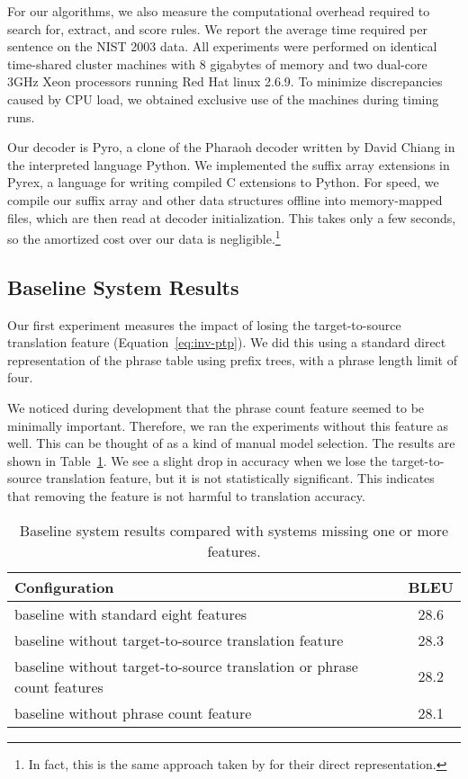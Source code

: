 For our algorithms, we also measure the computational
overhead required to search for, extract, and score rules.
We report the average time required
per sentence on the NIST 2003 data.  All experiments were
performed on identical time-shared cluster machines 
with 8 gigabytes of memory and two dual-core 3GHz Xeon 
processors running Red Hat linux 2.6.9.  
To minimize discrepancies caused by CPU
load, we obtained exclusive use of the machines during 
timing runs.

Our decoder is Pyro, a clone of the Pharaoh decoder
written by David Chiang in the interpreted language 
Python.  We implemented the suffix array extensions in 
Pyrex, a language for writing 
compiled C extensions to Python.  For speed, we compile
our suffix array and other data structures offline 
into memory-mapped files, which are then read at decoder
initialization.
This takes only a few seconds, so the
amortized cost over our data is negligible.\footnote{
In fact, this is the same approach taken by \citet{Zens:2007:hlt-naacl}
for their direct representation.}

\subsection{Baseline System Results}

Our first experiment measures the impact of losing
the target-to-source translation feature (Equation~\ref{eq:inv-ptp}).
We did this using a standard direct representation of the phrase
table using prefix trees, with a phrase length limit of four.

We noticed during development that the phrase count
feature seemed to be minimally important.  Therefore, we
ran the experiments without this feature as well.  This
can be thought of as a kind of manual model selection.
The results are shown in Table~\ref{table:model-selection}.
We see a slight drop in accuracy when we lose the target-to-source
translation feature, but it is not statistically significant.
This indicates that removing the feature is not harmful to
translation accuracy.

\figpreamble
\begin{table}
	\begin{center}
	\begin{tabular}{lc}
		Configuration & BLEU \\ \hline
		baseline with standard eight features & 28.6 \\
		baseline without target-to-source translation feature & 28.3 \\
		baseline without target-to-source translation or phrase count features & 28.2 \\
		baseline without phrase count feature & 28.1 \\
	\end{tabular}
	\end{center}
	\figpostamble
	\caption{Baseline system results compared with systems missing one or more features.}
	\label{table:model-selection}
\end{table}

